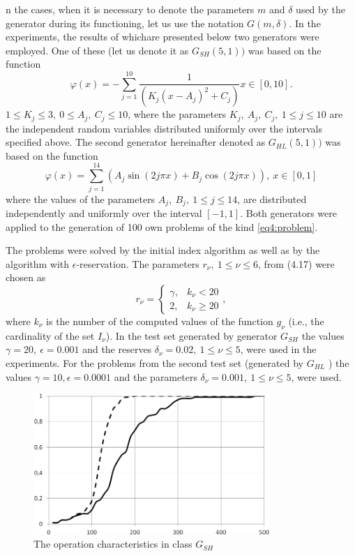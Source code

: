 n the cases, when it is necessary to denote the parameters $m$ and $\delta$ used by the generator during its functioning, let us use the notation $G ( m , \delta )$. In the experiments, the results of whichare presented below two generators were employed. One of these (let us denote it as $G_{SH} ( 5 , 1 ) )$ was based on the function
\begin{displaymath}
  \varphi(x)=-\sum_{j=1}^{10}\frac{1}{(K_j(x-A_j)^2+C_j)}x\in[0,10].
\end{displaymath}
$1\le K_j\le 3,\: 0\le A_j,\: C_j\le 10 $, where the parameters $K_j,\: A_j,\: C_j ,\: 1 \le j \le 10$ are the independent random variables distributed uniformly over the intervals specified above. The second generator hereinafter denoted as $G_{HL} ( 5 , 1 ) )$ was based on the function
\begin{equation}
  \varphi(x)=\sum_{j=1}^{14}(A_j\sin(2j\pi x) + B_j\cos(2j\pi x)),\: x\in[0,1]
\end{equation}
where the values of the parameters $A_j,\: B_j,\: 1 \le j \le 14$, are distributed independently and uniformly over the interval $[-1 ,1 ]$. Both generators were applied to the generation of 100 own
problems of the kind \eqref{eq4:problem}.

The problems were solved by the initial index algorithm as well as by the algorithm with $\epsilon$-reservation. The parameters $r_\nu ,\: 1 \le \nu \le 6$, from (4.17) were chosen as
\begin{displaymath}
  r_\nu = \left\{
  \begin{array}{lr}
    \gamma, & k_\nu < 20\\
    2, & k_\nu \ge 20
  \end{array}
  \right.,
\end{displaymath}
where $k_\nu$ is the number of the computed values of the function $g_\nu$ (i.e., the cardinality of the set $I_\nu$). In the test set generated by generator $G_{SH}$ the values $\gamma=20,\: \epsilon = 0.001$ and the reserves $\delta_\nu=0.02,\: 1 \le \nu \le 5$, were used in the experiments. For the problems from the second test set
(generated by $G_{HL}$ ) the values $\gamma = 10, \epsilon=0.0001$ and the parameters $\delta_\nu=0.001,\: 1 \le \nu\le 5$, were used.

\begin{figure}[ht]
  \centering
  \includegraphics[width=0.8\textwidth]{figures/4_9.png}
  \caption{The operation characteristics in class $G_{SH}$}
  \label{fig:4_9}
\end{figure}


